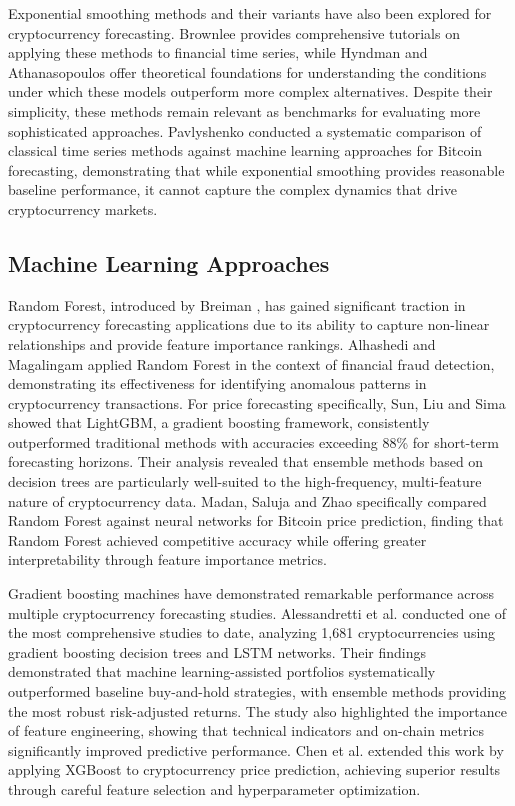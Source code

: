 \documentclass[conference]{IEEEtran}
\begin{document}
Exponential smoothing methods and their variants have also been explored for cryptocurrency forecasting. Brownlee \cite{brownlee2017} provides comprehensive tutorials on applying these methods to financial time series, while Hyndman and Athanasopoulos \cite{hyndman2021} offer theoretical foundations for understanding the conditions under which these models outperform more complex alternatives. Despite their simplicity, these methods remain relevant as benchmarks for evaluating more sophisticated approaches. Pavlyshenko \cite{pavlyshenko2019} conducted a systematic comparison of classical time series methods against machine learning approaches for Bitcoin forecasting, demonstrating that while exponential smoothing provides reasonable baseline performance, it cannot capture the complex dynamics that drive cryptocurrency markets.

\subsection{Machine Learning Approaches}

Random Forest, introduced by Breiman \cite{breiman2001}, has gained significant traction in cryptocurrency forecasting applications due to its ability to capture non-linear relationships and provide feature importance rankings. Alhashedi and Magalingam \cite{alhashedi2021} applied Random Forest in the context of financial fraud detection, demonstrating its effectiveness for identifying anomalous patterns in cryptocurrency transactions. For price forecasting specifically, Sun, Liu and Sima \cite{sun2020} showed that LightGBM, a gradient boosting framework, consistently outperformed traditional methods with accuracies exceeding 88\% for short-term forecasting horizons. Their analysis revealed that ensemble methods based on decision trees are particularly well-suited to the high-frequency, multi-feature nature of cryptocurrency data. Madan, Saluja and Zhao \cite{madan2019} specifically compared Random Forest against neural networks for Bitcoin price prediction, finding that Random Forest achieved competitive accuracy while offering greater interpretability through feature importance metrics.

Gradient boosting machines have demonstrated remarkable performance across multiple cryptocurrency forecasting studies. Alessandretti et al. \cite{alessandretti2018} conducted one of the most comprehensive studies to date, analyzing 1,681 cryptocurrencies using gradient boosting decision trees and LSTM networks. Their findings demonstrated that machine learning-assisted portfolios systematically outperformed baseline buy-and-hold strategies, with ensemble methods providing the most robust risk-adjusted returns. The study also highlighted the importance of feature engineering, showing that technical indicators and on-chain metrics significantly improved predictive performance. Chen et al. \cite{chen2020} extended this work by applying XGBoost to cryptocurrency price prediction, achieving superior results through careful feature selection and hyperparameter optimization.
\end{document}
